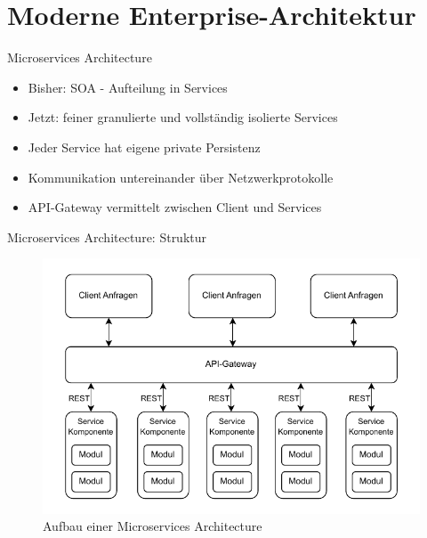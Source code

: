\section{Moderne Enterprise-Architektur}


\begin{frame}{Microservices Architecture}
    \begin{itemize}
        \item Bisher: SOA - Aufteilung in Services
        \item Jetzt: feiner granulierte und vollständig isolierte Services
        \item Jeder Service hat eigene private Persistenz
        \item Kommunikation untereinander über Netzwerkprotokolle
        \item API-Gateway vermittelt zwischen Client und Services
    \end{itemize}
\end{frame}

\begin{frame}{Microservices Architecture: Struktur}
    \begin{figure}[!h]
        \centering
        \includegraphics[scale=0.6]{imglib/microservices/microservices}
        \caption{Aufbau einer Microservices Architecture}
        \label{fig:microservices}
    \end{figure}
\end{frame}

